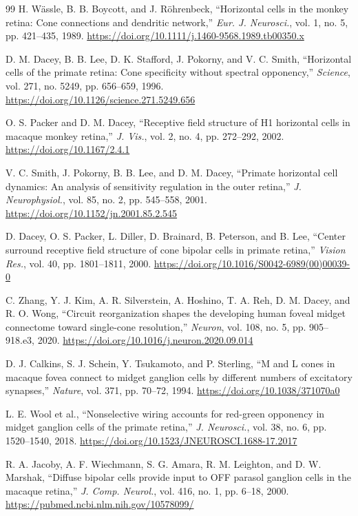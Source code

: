 \documentclass[a4paper,10pt,twocolumn,uplatex,dvipdfmx]{jsarticle}
\begin{document}
\begin{thebibliography}{99}
H. W\"assle, B. B. Boycott, and J. R\"ohrenbeck,
``Horizontal cells in the monkey retina: Cone connections and dendritic network,''
\textit{Eur. J. Neurosci.}, vol. 1, no. 5, pp. 421--435, 1989.
\url{https://doi.org/10.1111/j.1460-9568.1989.tb00350.x}

D. M. Dacey, B. B. Lee, D. K. Stafford, J. Pokorny, and V. C. Smith,
``Horizontal cells of the primate retina: Cone specificity without spectral opponency,''
\textit{Science}, vol. 271, no. 5249, pp. 656--659, 1996.
\url{https://doi.org/10.1126/science.271.5249.656}

O. S. Packer and D. M. Dacey,
``Receptive field structure of H1 horizontal cells in macaque monkey retina,''
\textit{J. Vis.}, vol. 2, no. 4, pp. 272--292, 2002.
\url{https://doi.org/10.1167/2.4.1}

V. C. Smith, J. Pokorny, B. B. Lee, and D. M. Dacey,
``Primate horizontal cell dynamics: An analysis of sensitivity regulation
in the outer retina,''
\textit{J. Neurophysiol.}, vol. 85, no. 2, pp. 545--558, 2001.
\url{https://doi.org/10.1152/jn.2001.85.2.545}

D. Dacey, O. S. Packer, L. Diller, D. Brainard, B. Peterson, and B. Lee,
``Center surround receptive field structure of cone bipolar cells in primate retina,''
\textit{Vision Res.}, vol. 40, pp. 1801--1811, 2000.
\url{https://doi.org/10.1016/S0042-6989(00)00039-0}

C. Zhang, Y. J. Kim, A. R. Silverstein, A. Hoshino, T. A. Reh,
D. M. Dacey, and R. O. Wong,
``Circuit reorganization shapes the developing human foveal midget
connectome toward single-cone resolution,''
\textit{Neuron}, vol. 108, no. 5, pp. 905--918.e3, 2020.
\url{https://doi.org/10.1016/j.neuron.2020.09.014}

D. J. Calkins, S. J. Schein, Y. Tsukamoto, and P. Sterling,
``M and L cones in macaque fovea connect to midget ganglion cells by
different numbers of excitatory synapses,''
\textit{Nature}, vol. 371, pp. 70--72, 1994.
\url{https://doi.org/10.1038/371070a0}

L. E. Wool et al.,
``Nonselective wiring accounts for red-green opponency in midget ganglion
cells of the primate retina,''
\textit{J. Neurosci.}, vol. 38, no. 6, pp. 1520--1540, 2018.
\url{https://doi.org/10.1523/JNEUROSCI.1688-17.2017}

R. A. Jacoby, A. F. Wiechmann, S. G. Amara, R. M. Leighton, and D. W. Marshak,
``Diffuse bipolar cells provide input to OFF parasol ganglion cells in the
macaque retina,''
\textit{J. Comp. Neurol.}, vol. 416, no. 1, pp. 6--18, 2000.
\url{https://pubmed.ncbi.nlm.nih.gov/10578099/}


\end{thebibliography}
\end{document}
